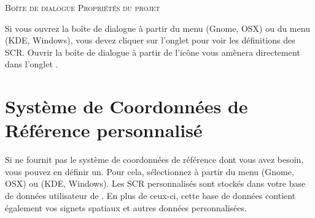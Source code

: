 \begin{Tip}
\caption{\textsc{Boîte de dialogue Propriétés du projet}}
Si vous ouvrez la boîte de dialogue  à partir du
menu  (Gnome, OSX) ou du menu  
(KDE, Windows), vous devez cliquer sur l'onglet  pour voir les définitions des SCR. Ouvrir la
boîte de dialogue à partir de l'icône
 vous amènera 
directement dans l'onglet .
\end{Tip} 

\section{Système de Coordonnées de Référence personnalisé}
\label{sec:customprojections}

Si \qg ne fournit pas le système de coordonnées de référence dont vous avez
besoin, vous pouvez en définir un. Pour cela, sélectionnez
 à partir du menu
 (Gnome, OSX) ou  (KDE, Windows). 
Les SCR personnalisés sont stockés dans votre base de données utilisateur de \qg. 
En plus de ceux-ci, cette base de données contient également vos signets 
spatiaux et autres données personnalisées.

